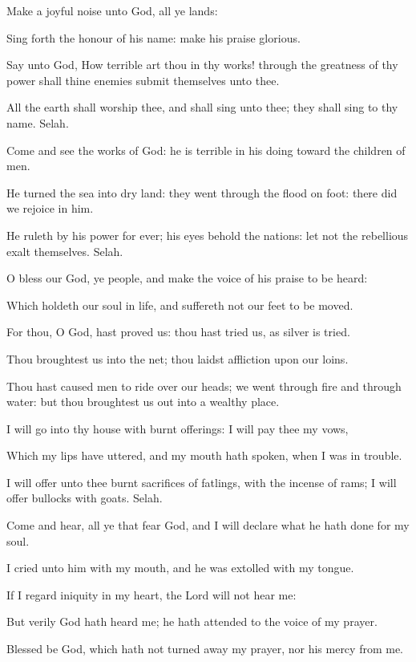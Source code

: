 \Chapter
\Verse Make a joyful noise unto God, all ye lands:

\Verse Sing forth the honour of his name: make his praise glorious.

\Verse Say unto God, How terrible art thou in thy works! through the greatness of thy power shall thine enemies submit themselves unto thee.

\Verse All the earth shall worship thee, and shall sing unto thee; they shall sing to thy name. Selah.

\Verse Come and see the works of God: he is terrible in his doing toward the children of men.

\Verse He turned the sea into dry land: they went through the flood on foot: there did we rejoice in him.

\Verse He ruleth by his power for ever; his eyes behold the nations: let not the rebellious exalt themselves. Selah.

\Verse O bless our God, ye people, and make the voice of his praise to be heard:

\Verse Which holdeth our soul in life, and suffereth not our feet to be moved.

\Verse For thou, O God, hast proved us: thou hast tried us, as silver is tried.

\Verse Thou broughtest us into the net; thou laidst affliction upon our loins.

\Verse Thou hast caused men to ride over our heads; we went through fire and through water: but thou broughtest us out into a wealthy place.

\Verse I will go into thy house with burnt offerings: I will pay thee my vows,

\Verse Which my lips have uttered, and my mouth hath spoken, when I was in trouble.

\Verse I will offer unto thee burnt sacrifices of fatlings, with the incense of rams; I will offer bullocks with goats. Selah.

\Verse Come and hear, all ye that fear God, and I will declare what he hath done for my soul.

\Verse I cried unto him with my mouth, and he was extolled with my tongue.

\Verse If I regard iniquity in my heart, the Lord will not hear me:

\Verse But verily God hath heard me; he hath attended to the voice of my prayer.

\Verse Blessed be God, which hath not turned away my prayer, nor his mercy from me.





